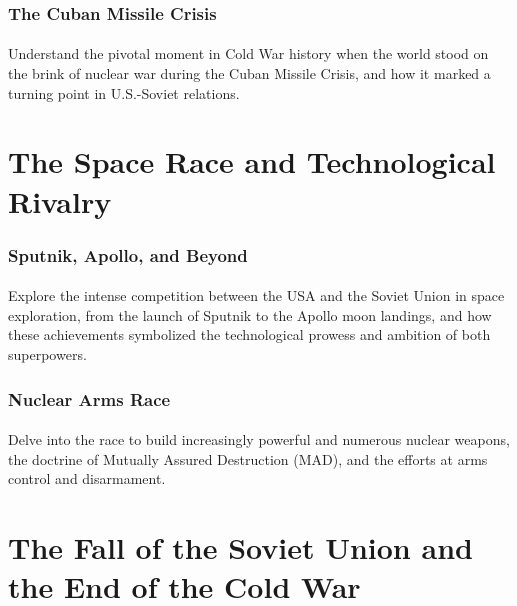 \documentclass[a4paper,12pt]{book}
\begin{document}
\subsubsection*{The Cuban Missile Crisis}
\paragraph{}
Understand the pivotal moment in Cold War history when the world stood on the brink of nuclear war during the Cuban Missile Crisis, and how it marked a turning point in U.S.-Soviet relations.

\section*{The Space Race and Technological Rivalry}
\paragraph{}
\subsubsection*{Sputnik, Apollo, and Beyond}
\paragraph{}
Explore the intense competition between the USA and the Soviet Union in space exploration, from the launch of Sputnik to the Apollo moon landings, and how these achievements symbolized the technological prowess and ambition of both superpowers.

\subsubsection*{Nuclear Arms Race}
\paragraph{}
Delve into the race to build increasingly powerful and numerous nuclear weapons, the doctrine of Mutually Assured Destruction (MAD), and the efforts at arms control and disarmament.

\section*{The Fall of the Soviet Union and the End of the Cold War}
\paragraph{}
\end{document}
